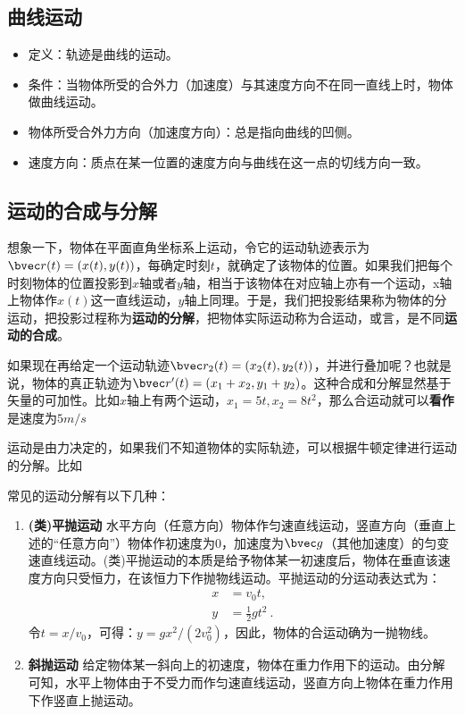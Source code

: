 

\subsection{曲线运动}

\begin{itemize}
\item 定义：轨迹是曲线的运动。
\item 条件：当物体所受的合外力（加速度）与其速度方向不在同一直线上时，物体做曲线运动。
\item 物体所受合外力方向（加速度方向）：总是指向曲线的凹侧。
\item 速度方向：质点在某一位置的速度方向与曲线在这一点的切线方向一致。
\end{itemize}

\subsection{运动的合成与分解}
想象一下，物体在平面直角坐标系上运动，令它的运动轨迹表示为$\bvec r(t)=(x(t),y(t))$，每确定时刻$t$，就确定了该物体的位置。如果我们把每个时刻物体的位置投影到$x$轴或者$y$轴，相当于该物体在对应轴上亦有一个运动，x轴上物体作$x(t)$这一直线运动，$y$轴上同理。于是，我们把投影结果称为物体的分运动，把投影过程称为\textbf{运动的分解}，把物体实际运动称为合运动，或言，是不同\textbf{运动的合成}。

如果现在再给定一个运动轨迹$\bvec r_2(t)=(x_2(t),y_2(t))$，并进行叠加呢？也就是说，物体的真正轨迹为$\bvec r'(t)=(x_1+x_2,y_1+y_2)$。这种合成和分解显然基于矢量的可加性。比如$x$轴上有两个运动，$x_1=5t,x_2=8t^2$，那么合运动就可以\textbf{看作}是速度为$5m/s$

运动是由力决定的，如果我们不知道物体的实际轨迹，可以根据牛顿定律进行运动的分解。比如

常见的运动分解有以下几种：
\begin{enumerate}
\item \textbf{ (类)平抛运动} 水平方向（任意方向）物体作匀速直线运动，竖直方向（垂直上述的“任意方向”）物体作初速度为$0$，加速度为$\bvec g$（其他加速度）的匀变速直线运动。(类)平抛运动的本质是给予物体某一初速度后，物体在垂直该速度方向只受恒力，在该恒力下作抛物线运动。平抛运动的分运动表达式为：
\begin{equation}
\begin{aligned}
x&=v_0t,\\
y&=\frac{1}{2}gt^2~.
\end{aligned}
\end{equation} 令$t=x/v_0$，可得：$y=gx^2/(2v_0^2)$，因此，物体的合运动确为一抛物线。
\item \textbf{斜抛运动} 给定物体某一斜向上的初速度，物体在重力作用下的运动。由分解可知，水平上物体由于不受力而作匀速直线运动，竖直方向上物体在重力作用下作竖直上抛运动。
\end{enumerate}


